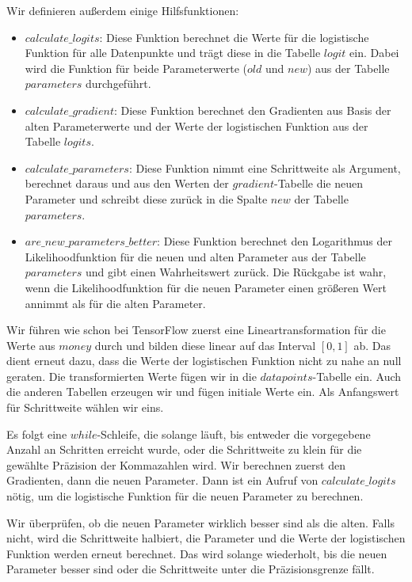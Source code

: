 Wir definieren außerdem einige Hilfsfunktionen:
\begin{itemize}
  \item $calculate\_logits$: Diese Funktion berechnet die Werte für die logistische Funktion für alle Datenpunkte und trägt diese in die Tabelle $logit$ ein. Dabei wird die Funktion für beide Parameterwerte ($old$ und $new$) aus der Tabelle $parameters$ durchgeführt.
  \item $calculate\_gradient$: Diese Funktion berechnet den Gradienten aus Basis der alten Parameterwerte und der Werte der logistischen Funktion aus der Tabelle $logits$.
  \item $calculate\_parameters$: Diese Funktion nimmt eine Schrittweite als Argument, berechnet daraus und aus den Werten der $gradient$-Tabelle die neuen Parameter und schreibt diese zurück in die Spalte $new$ der Tabelle $parameters$.
  \item $are\_new\_parameters\_better$: Diese Funktion berechnet den Logarithmus der Likelihoodfunktion für die neuen und alten Parameter aus der Tabelle $parameters$ und gibt einen Wahrheitswert zurück. Die Rückgabe ist wahr, wenn die Likelihoodfunktion für die neuen Parameter einen größeren Wert annimmt als für die alten Parameter.
\end{itemize}

Wir führen wie schon bei TensorFlow zuerst eine Lineartransformation für die Werte aus $money$ durch und bilden diese linear auf das Interval $[0, 1]$ ab. Das dient erneut dazu, dass die Werte der logistischen Funktion nicht zu nahe an null geraten. Die transformierten Werte fügen wir in die $datapoints$-Tabelle ein. Auch die anderen Tabellen erzeugen wir und fügen initiale Werte ein. Als Anfangswert für Schrittweite wählen wir eins.

Es folgt eine $while$-Schleife, die solange läuft, bis entweder die vorgegebene Anzahl an Schritten erreicht wurde, oder die Schrittweite zu klein für die gewählte Präzision der Kommazahlen wird. Wir berechnen zuerst den Gradienten, dann die neuen Parameter. Dann ist ein Aufruf von $calculate\_logits$ nötig, um die logistische Funktion für die neuen Parameter zu berechnen.

Wir überprüfen, ob die neuen Parameter wirklich besser sind als die alten. Falls nicht, wird die Schrittweite halbiert, die Parameter und die Werte der logistischen Funktion werden erneut berechnet. Das wird solange wiederholt, bis die neuen Parameter besser sind oder die Schrittweite unter die Präzisionsgrenze fällt.

